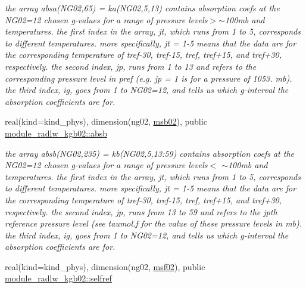 \begin{DoxyCompactItemize}
\begin{DoxyCompactList}\small\item\em the array absa(\+N\+G02,65) = ka(\+N\+G02,5,13) contains absorption coefs at the N\+G02=12 chosen g-\/values for a range of pressure levels$>$$\sim$100mb and temperatures. the first index in the array, jt, which runs from 1 to 5, corresponds to different temperatures. more specifically, jt = 1-\/5 means that the data are for the corresponding temperature of tref-\/30, tref-\/15, tref, tref+15, and tref+30, respectively. the second index, jp, runs from 1 to 13 and refers to the corresponding pressure level in pref (e.\+g. jp = 1 is for a pressure of 1053. mb). the third index, ig, goes from 1 to N\+G02=12, and tells us which g-\/interval the absorption coefficients are for. \end{DoxyCompactList}\item 
\mbox{\label{group__module__radlw__kgbnn_gacf34f9255586c9ed5ac5370db5b63c14}} 
real(kind=kind\+\_\+phys), dimension(ng02, \hyperlink{group__module__radlw__kgbnn_ga03e70b84fd16795104a3fb7b425af70c}{msb02}), public \hyperlink{group__module__radlw__kgbnn_gacf34f9255586c9ed5ac5370db5b63c14}{module\+\_\+radlw\+\_\+kgb02\+::absb}
\begin{DoxyCompactList}\small\item\em the array absb(\+N\+G02,235) = kb(\+N\+G02,5,13\+:59) contains absorption coefs at the N\+G02=12 chosen g-\/values for a range of pressure levels$<$ $\sim$100mb and temperatures. the first index in the array, jt, which runs from 1 to 5, corresponds to different temperatures. more specifically, jt = 1-\/5 means that the data are for the corresponding temperature of tref-\/30, tref-\/15, tref, tref+15, and tref+30, respectively. the second index, jp, runs from 13 to 59 and refers to the jpth reference pressure level (see taumol.\+f for the value of these pressure levels in mb). the third index, ig, goes from 1 to N\+G02=12, and tells us which g-\/interval the absorption coefficients are for. \end{DoxyCompactList}\item 
\mbox{\label{group__module__radlw__kgbnn_gaddb071e93b4ff49ba1f1c4d102e275f1}} 
real(kind=kind\+\_\+phys), dimension(ng02, \hyperlink{group__module__radlw__kgbnn_ga99b728d38d664afc203303563541ab5c}{msf02}), public \hyperlink{group__module__radlw__kgbnn_gaddb071e93b4ff49ba1f1c4d102e275f1}{module\+\_\+radlw\+\_\+kgb02\+::selfref}

\end{DoxyCompactItemize}
